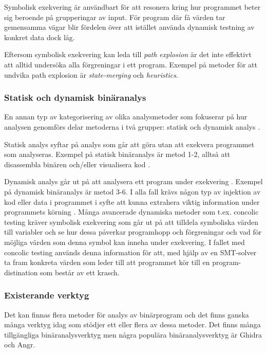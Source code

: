 Symbolisk exekvering är användbart för att resonera kring hur programmet beter sig 
beroende på grupperingar av input. För program där få värden tar gemensamma vägar blir 
fördelen över att istället använda dynamisk testning av konkret data dock låg. 

Eftersom symbolisk exekvering kan leda till \emph{path explosion} är det inte effektivt 
att alltid undersöka alla förgreningar i ett program. Exempel på metoder för att undvika 
path explosion är \emph{state-merging} och \emph{heuristics}. 

\subsubsection{Statisk och dynamisk binäranalys}
En annan typ av kategorisering av olika analysmetoder som fokuserar på hur
analysen genomförs delar metoderna i två grupper: statisk och dynamisk analys
\cite{dynamic_bin_analysis}.

Statisk analys syftar på analys som går att göra utan att exekvera programmet
som analyseras. Exempel på statisk binäranalys är metod 1-2, alltså att
disassembla binären och/eller visualisera kod \cite{dynamic_bin_analysis}.

Dynamisk analys går ut på att analysera ett program under exekvering
\cite{dynamic_bin_analysis}. Exempel på dynamisk binäranalys är metod 3-6. I
alla fall krävs någon typ av injektion av kod eller data i programmet i syfte
att kunna extrahera viktig information under programmets körning
\cite{dynamic_bin_analysis}. Många avancerade dynamiska metoder som t.ex.
concolic testing kräver symbolisk exekvering som går ut på att tilldela
symboliska värden till variabler och se hur dessa påverkar programhopp och
förgreningar och vad för möjliga värden som denna symbol kan inneha under
exekvering. I fallet med concolic testing används denna information för att,
med hjälp av en SMT-solver ta fram konkreta värden som leder till att
programmet kör till en program-distination som består av ett krasch.

\subsubsection{Existerande verktyg}
Det kan finnas flera metoder för analys av binärprogram och det finns ganska
många verktyg idag som stödjer ett eller flera av dessa metoder. Det finns
många tillgängliga binäranalysverktyg men några populära binäranalysverktyg är
Ghidra\cite{ghidra_website} och Angr\cite{angr_web}.

